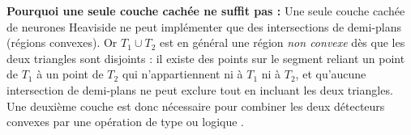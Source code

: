 {\begin{enumerate}
{			\textbf{Pourquoi une seule couche cachée ne suffit pas :}
			Une seule couche cachée de neurones Heaviside ne peut implémenter que des
			intersections de demi-plans (régions convexes). Or $T_1 \cup T_2$ est en général
			une région \emph{non convexe} dès que les deux triangles sont disjoints :
			il existe des points sur le segment reliant un point de $T_1$ à un point de $T_2$
			qui n'appartiennent ni à $T_1$ ni à $T_2$, et qu'aucune intersection de
			demi-plans ne peut exclure tout en incluant les deux triangles.
			Une deuxième couche est donc nécessaire pour combiner les deux détecteurs convexes
			par une opération de type \og ou logique \fg.
		}
		
	\end{enumerate}
}